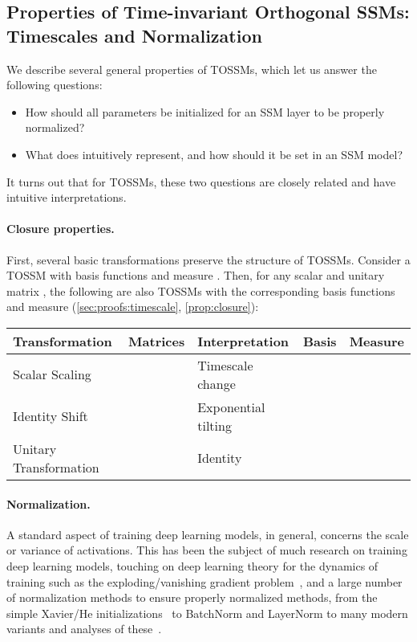 \documentclass{article}
\newcommand{\para}[1]{\paragraph{#1}}
\begin{document}
\subsection{Properties of Time-invariant Orthogonal SSMs: Timescales and Normalization}
\label{sec:hippo:timescale}

We describe several general properties of TOSSMs,
which let us answer the following questions:
\begin{itemize}[leftmargin=*,itemsep=0pt]\item How should all parameters  be initialized for an SSM layer to be properly normalized?
  \item What does  intuitively represent, and how should it be set in an SSM model?
\end{itemize}


It turns out that for TOSSMs, these two questions are closely related and have intuitive interpretations.

\para{Closure properties.}
First, several basic transformations preserve the structure of TOSSMs.
  Consider a TOSSM  with basis functions  and measure .
  Then, for any scalar  and unitary matrix , the following are also TOSSMs with the corresponding basis functions and measure (\cref{sec:proofs:timescale}, \cref{prop:closure}):
\begin{center}
  \small
  \begin{tabular}{@{}lllll@{}}
    \toprule
    Transformation & Matrices & Interpretation & Basis & Measure \\
    \midrule
    Scalar Scaling &  & Timescale change &  &  \\
    Identity Shift &  & Exponential tilting &  &  \\
    Unitary Transformation &  & Identity &  &  \\
    \bottomrule
  \end{tabular}
   \label{tab:closure}
\end{center}




\paragraph{Normalization.}
A standard aspect of training deep learning models, in general, concerns the scale or variance of activations.
This has been the subject of much research on training deep learning models,
touching on deep learning theory for the dynamics of training such as
the exploding/vanishing gradient problem~\citep{hochreiter1991untersuchungen},
and a large number of normalization methods to ensure properly normalized methods,
from the simple Xavier/He initializations~\citep{glorot2010understanding,he2015delving} to BatchNorm and LayerNorm \citep{ioffe2015batch,ba2016layer} to many modern variants and analyses of these~\citep{davis2021catformer}.
\end{document}
